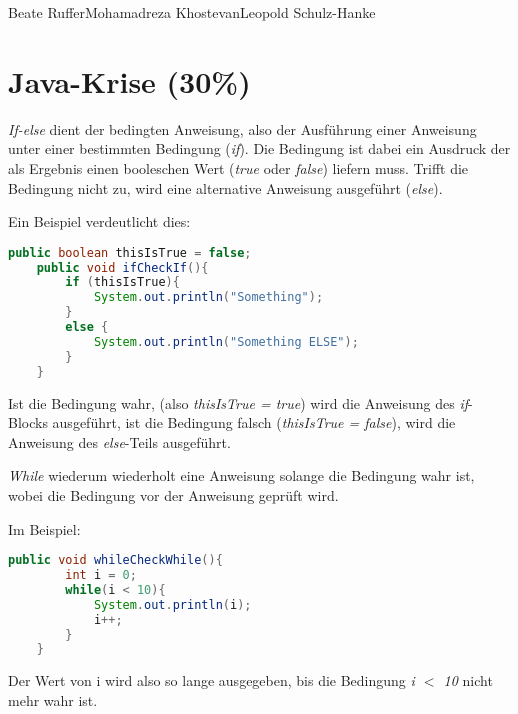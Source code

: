 \documentclass{pi1}
\begin{document}
		{Beate Ruffer}{Mohamadreza Khostevan}{Leopold Schulz-Hanke}

\section{Java-Krise (30\%)}

\emph{If-else} dient der bedingten Anweisung, also der Ausführung einer Anweisung unter einer bestimmten Bedingung (\emph{if}). Die Bedingung ist dabei ein Ausdruck der als Ergebnis einen booleschen Wert (\emph{true} oder \emph{false}) liefern muss. Trifft die Bedingung nicht zu, wird eine alternative Anweisung ausgeführt (\emph{else}).

Ein Beispiel verdeutlicht dies:

\begin{lstlisting}[caption={}, firstnumber=1, language=Java]
    public boolean thisIsTrue = false;
    public void ifCheckIf(){
        if (thisIsTrue){
            System.out.println("Something");
        }
        else {
            System.out.println("Something ELSE");
        }
    }
\end{lstlisting}

Ist die Bedingung wahr, (also \emph{thisIsTrue = true}) wird die Anweisung des \emph{if}-Blocks ausgeführt, ist die Bedingung falsch (\emph{thisIsTrue = false}), wird die Anweisung des \emph{else}-Teils ausgeführt.

\emph{While} wiederum wiederholt eine Anweisung solange die Bedingung wahr ist, wobei die Bedingung vor der Anweisung geprüft wird.

Im Beispiel:

\begin{lstlisting}[caption={}, firstnumber=1, language=Java]
 public void whileCheckWhile(){
        int i = 0;
        while(i < 10){
            System.out.println(i);
            i++;
        }
    }
\end{lstlisting}

Der Wert von i wird also so lange ausgegeben, bis die Bedingung \emph{i $<$ 10} nicht mehr wahr ist.
\end{document}
